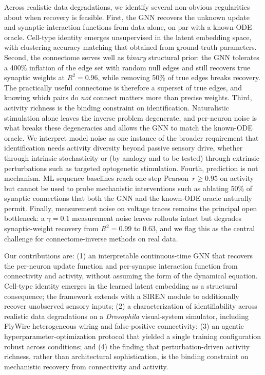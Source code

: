 \documentclass{article}
\begin{document}
Across realistic data degradations, we identify several non-obvious regularities about when recovery is feasible.
First, the GNN recovers the unknown update and synaptic-interaction functions from data alone, on par with a known-ODE oracle.
Cell-type identity emerges unsupervised in the latent embedding space, with clustering accuracy matching that obtained from ground-truth parameters.
Second, the connectome serves well as \emph{binary} structural prior: the GNN tolerates a 400\% inflation of the edge set with random null edges and still recovers true synaptic weights at $R^2=0.96$, while removing 50\% of true edges breaks recovery.
The practically useful connectome is therefore a superset of true edges, and knowing which pairs do \emph{not} connect matters more than precise weights.
Third, activity richness is the binding constraint on identification.
Naturalistic stimulation alone leaves the inverse problem degenerate, and per-neuron noise is what breaks these degeneracies and allows the GNN to match the known-ODE oracle.
We interpret model noise as one instance of the broader requirement that identification needs activity diversity beyond passive sensory drive, whether through intrinsic stochasticity or (by analogy and to be tested) through extrinsic perturbations such as targeted optogenetic stimulation.
Fourth, prediction is not mechanism.
ML sequence baselines reach one-step Pearson~$r\geq0.95$ on activity but cannot be used to probe mechanistic interventions such as ablating 50\% of synaptic connections that both the GNN and the known-ODE oracle naturally permit.
Finally, measurement noise on voltage traces remains the principal open bottleneck: a $\gamma = 0.1$ measurement noise leaves rollouts intact but degrades synaptic-weight recovery from $R^2 = 0.99$ to $0.63$, and we flag this as the central challenge for connectome-inverse methods on real data.

Our contributions are:
(1) an interpretable continuous-time GNN that recovers the per-neuron update function and per-synapse interaction function from connectivity and activity, without assuming the form of the dynamical equation.
Cell-type identity emerges in the learned latent embedding as a structural consequence; the framework extends with a SIREN module to additionally recover unobserved sensory inputs;
(2) a characterization of identifiability across realistic data degradations on a \emph{Drosophila} visual-system simulator, including FlyWire heterogeneous wiring and false-positive connectivity;
(3) an agentic hyperparameter-optimization protocol that yielded a single training configuration robust across conditions; and
(4) the finding that perturbation-driven activity richness, rather than architectural sophistication, is the binding constraint on mechanistic recovery from connectivity and activity.
\end{document}
